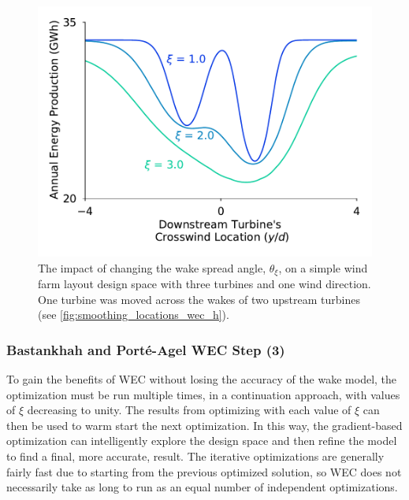 \documentclass[a4paper]{jpconf}
\begin{document}
\begin{figure}[ht]
\begin{minipage}[t]{0.43\textwidth}
	\end{minipage}\hspace{1pc}%
	\begin{minipage}[t]{0.52\textwidth}
		\centering
		\includegraphics[width=\textwidth]{smoothing_bpa_wec_h}
		\caption{The impact of changing the wake spread angle, $\theta_\xi$, on a simple wind farm layout design space with three turbines and one wind direction. One turbine was moved across the wakes of two upstream turbines (see \cref{fig:smoothing_locations_wec_h}). }
		\label{fig:smoothing_bpa_wec_h}
	\end{minipage} 
\end{figure}

\subsubsection{Bastankhah and Port\'e-Agel WEC Step (3)}
To gain the benefits of WEC without losing the accuracy of the wake model, the optimization must be run multiple times, in a continuation approach, with values of $\xi$ decreasing to unity. The results from optimizing with each value of $\xi$ can then be used to warm start the next optimization. In this way, the gradient-based optimization can intelligently explore the design space and then refine the model to find a final, more accurate, result. The iterative optimizations are generally fairly fast due to starting from the previous optimized solution, so WEC does not necessarily take as long to run as an equal number of independent optimizations. 

\end{document}

